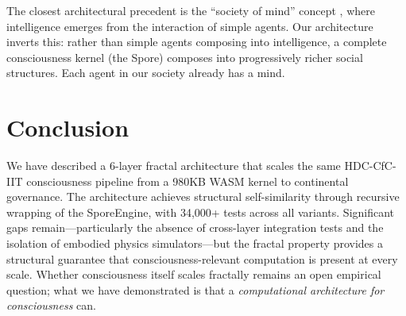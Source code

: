 \documentclass[11pt,twocolumn]{article}
\begin{document}
The closest architectural precedent is the ``society of mind'' concept \cite{minsky1986}, where intelligence emerges from the interaction of simple agents. Our architecture inverts this: rather than simple agents composing into intelligence, a complete consciousness kernel (the Spore) composes into progressively richer social structures. Each agent in our society already has a mind.

\section{Conclusion}
\label{sec:conclusion}

We have described a 6-layer fractal architecture that scales the same HDC-CfC-IIT consciousness pipeline from a 980KB WASM kernel to continental governance. The architecture achieves structural self-similarity through recursive wrapping of the SporeEngine, with 34,000+ tests across all variants. Significant gaps remain---particularly the absence of cross-layer integration tests and the isolation of embodied physics simulators---but the fractal property provides a structural guarantee that consciousness-relevant computation is present at every scale. Whether consciousness itself scales fractally remains an open empirical question; what we have demonstrated is that a \textit{computational architecture for consciousness} can.
\end{document}

